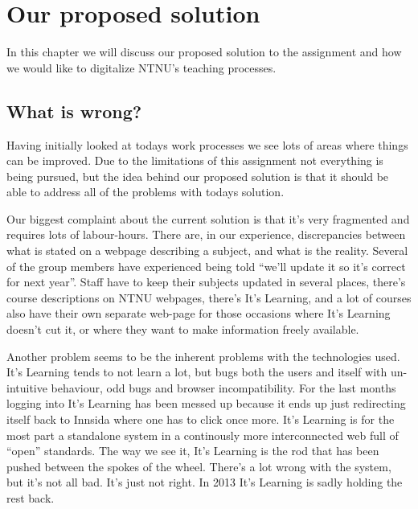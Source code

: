 \section{Our proposed solution}

In this chapter we will discuss our proposed solution to the assignment and how we would like to digitalize NTNU's teaching processes. 

\subsection{What is wrong?}
Having initially looked at todays work processes we see lots of areas where things can be improved. Due to the limitations of this assignment not everything
is being pursued, but the idea behind our proposed solution is that it should be able to address all of the problems with todays solution. 

\noindent
Our biggest complaint about the current solution is that it's very fragmented and requires lots of labour-hours. There are, in our experience, discrepancies between what is 
stated on a webpage describing a subject, and what is the reality. Several of the group members have experienced being told ``we'll update it so it's correct for next year''. 
Staff have to keep their subjects updated in several places, there's course descriptions on NTNU webpages, there's It's Learning, and a lot of courses also have their own separate
web-page for those occasions where It's Learning doesn't cut it, or where they want to make information freely available. 

\noindent
Another problem seems to be the inherent problems with the technologies used. It's Learning tends to not learn a lot, but bugs both the users and itself with un-intuitive behaviour, 
odd bugs and browser incompatibility. For the last months logging into It's Learning has been messed up because it ends up just redirecting itself back to Innsida where one has to 
click once more. It's Learning is for the most part a standalone system in a continously more interconnected web full of ``open'' standards. The way we see it, It's Learning is the 
rod that has been pushed between the spokes of the wheel. There's a lot wrong with the system, but it's not all bad. It's just not right. In 2013 It's Learning is sadly holding the 
rest back. 

